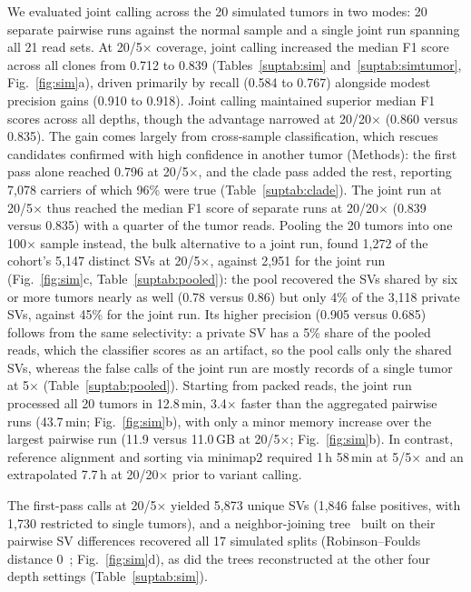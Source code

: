 We evaluated joint calling across the 20 simulated tumors in two modes: 20 separate pairwise runs against the normal sample and a single joint run spanning all 21 read sets. At 20/5$\times$ coverage, joint calling increased the median F1 score across all clones from 0.712 to 0.839 (Tables~\ref{suptab:sim} and~\ref{suptab:simtumor}, Fig.~\ref{fig:sim}a), driven primarily by recall (0.584 to 0.767) alongside modest precision gains (0.910 to 0.918). Joint calling maintained superior median F1 scores across all depths, though the advantage narrowed at 20/20$\times$ (0.860 versus 0.835). The gain comes largely from cross-sample classification, which rescues candidates confirmed with high confidence in another tumor (Methods): the first pass alone reached 0.796 at 20/5$\times$, and the clade pass added the rest, reporting 7,078 carriers of which 96\% were true (Table~\ref{suptab:clade}). The joint run at 20/5$\times$ thus reached the median F1 score of separate runs at 20/20$\times$ (0.839 versus 0.835) with a quarter of the tumor reads. Pooling the 20 tumors into one 100$\times$ sample instead, the bulk alternative to a joint run, found 1,272 of the cohort's 5,147 distinct SVs at 20/5$\times$, against 2,951 for the joint run (Fig.~\ref{fig:sim}c, Table~\ref{suptab:pooled}): the pool recovered the SVs shared by six or more tumors nearly as well (0.78 versus 0.86) but only 4\% of the 3,118 private SVs, against 45\% for the joint run. Its higher precision (0.905 versus 0.685) follows from the same selectivity: a private SV has a 5\% share of the pooled reads, which the classifier scores as an artifact, so the pool calls only the shared SVs, whereas the false calls of the joint run are mostly records of a single tumor at 5$\times$ (Table~\ref{suptab:pooled}). Starting from packed reads, the joint run processed all 20 tumors in 12.8\,min, 3.4$\times$ faster than the aggregated pairwise runs (43.7\,min; Fig.~\ref{fig:sim}b), with only a minor memory increase over the largest pairwise run (11.9 versus 11.0\,GB at 20/5$\times$; Fig.~\ref{fig:sim}b). In contrast, reference alignment and sorting via minimap2 required 1\,h 58\,min at 5/5$\times$ and an extrapolated 7.7\,h at 20/20$\times$ prior to variant calling.

The first-pass calls at 20/5$\times$ yielded 5,873 unique SVs (1,846 false positives, with 1,730 restricted to single tumors), and a neighbor-joining tree~\cite{nj,ape} built on their pairwise SV differences recovered all 17 simulated splits (Robinson--Foulds distance 0~\cite{rf}; Fig.~\ref{fig:sim}d), as did the trees reconstructed at the other four depth settings (Table~\ref{suptab:sim}).

